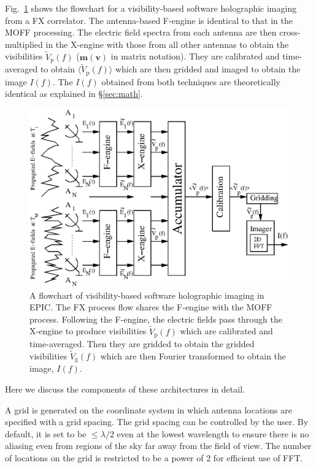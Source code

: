 \documentclass[a4paper,fleqn,usenatbib]{mnras}
\begin{document}
Fig.~\ref{fig:FX-flowchart} shows the flowchart for a visibility-based software 
holographic imaging from a FX correlator. The antenna-based F-engine is identical 
to that in the MOFF processing. The electric field spectra from each antenna are 
then cross-multiplied in the X-engine with those from all other antennas to 
obtain the visibilities $\widetilde{V}_\textrm{p}(f)$ ($\mathbf{m}(\mathbf{v})$ 
in matrix notation). They are calibrated and time-averaged to obtain 
$\langle \widetilde{V}_\textrm{p}(f)\rangle$ which are then gridded and imaged to 
obtain the image $I(f)$. The $I(f)$ obtained from both techniques are 
theoretically identical as explained in \S\ref{sec:math}.

\begin{figure}
  \includegraphics[width=\columnwidth]{figure2}
  \caption{A flowchart of visibility-based software holographic imaging in EPIC. 
    The FX process flow shares the F-engine with the MOFF process. Following the 
    F-engine, the electric fields pass through the X-engine to produce 
    visibilities $\widetilde{V}_\textrm{p}(f)$ which are calibrated and 
    time-averaged. Then they are gridded to obtain the gridded visibilities 
    $\widetilde{V}_\textrm{g}(f)$ which are then Fourier transformed to obtain 
    the image, $I(f)$.}
  \label{fig:FX-flowchart}
\end{figure}

Here we discuss the components of these architectures in detail. 

\par\medskip
{}
\par\medskip
\noindent A grid is generated on the coordinate system in which antenna 
locations are specified with a grid spacing. The grid spacing can be controlled 
by the user. By default, it is set to be $\le\lambda/2$ even at the 
lowest wavelength to ensure there is no aliasing even from regions of the sky 
far away from the field of view. The number of locations on the grid is 
restricted to be a power of 2 for efficient use of FFT. 
\end{document}
